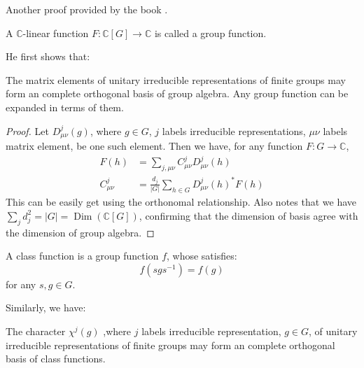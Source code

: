     Another proof provided by the book \cite{book}.
    \begin{defi}
        A $\mathbb{C}$-linear function $F:\mathbb{C}[G]\to
        \mathbb{C}$ is called a group function.
    \end{defi}
    He first shows that:
    \begin{thm}
        The matrix elements of unitary irreducible representations of
        finite groups may form an complete orthogonal basis of group
        algebra. Any group function can be expanded in terms of them.
    \end{thm}
    \begin{proof}
        Let $D^j_{\mu\nu}(g)$, where $g\in G$, $j$ labels irreducible
        representations, $\mu\nu$ labels matrix element, be one such
        element. Then we have, for any function $F:G\to \mathbb{C}$,
        \begin{align}
            F(h) &= \sum_{j,\mu\nu} C^j_{\mu\nu} D^j_{\mu\nu}(h) \\
            C^j_{\mu\nu} &= \frac{d_j}{|G|}
            \sum_{h\in G} D^j_{\mu\nu}(h)^* F(h)
            \label{eq:20161031-cjmv}
        \end{align}
        This can be easily get using the orthonomal relationship.
        Also notes that we have $\sum_j d^2_j = |G| =
        \operatorname{Dim}(\mathbb{C}[G])$, confirming that the
        dimension of basis agree with the dimension of group algebra.
    \end{proof}
    \begin{defi}
        A class function is a group function $f$, whose satisfies:
        \begin{equation}
            f(s g s^{-1}) = f(g)
        \end{equation}
        for any $s,g\in G$.
    \end{defi}
    Similarly, we have:
    \begin{thm}
        The character $\chi^j(g)$ ,where $j$ labels irreducible
        representation, $g\in G$, of unitary irreducible representations of
        finite groups may form an complete orthogonal basis of class
        functions.
    \end{thm}
